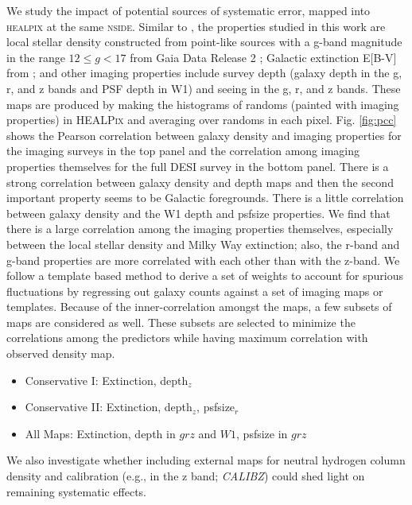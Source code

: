 We study the impact of potential sources of systematic error, mapped into \textsc{healpix} at the same \textsc{nside}. Similar to \cite{zhou2022target}, the properties studied in this work are local stellar density constructed from point-like sources with a g-band magnitude in the range $12 \leq g < 17$ from Gaia Data Release 2 \citep[see,][]{gaiadr2, myers2022};  Galactic extinction E[B-V] from \cite{schlegel1998maps}; and other imaging properties include survey depth (galaxy depth in the g, r, and z bands and PSF depth in W1) and seeing in the g, r, and z bands. These maps are produced by making the histograms of randoms (painted with imaging properties) in \textsc{HEALPix} and averaging over randoms in each pixel. Fig. \ref{fig:pcc} shows the Pearson correlation between galaxy density and imaging properties for the imaging surveys in the top panel and the correlation among imaging properties themselves for the full DESI survey in the bottom panel. There is a strong correlation between galaxy density and depth maps and then the second important property seems to be Galactic foregrounds. There is a little correlation between galaxy density and the W1 depth and psfsize properties. We find that there is a large correlation among the imaging properties themselves, especially between the local stellar density and Milky Way extinction; also, the r-band and g-band properties are more correlated with each other than with the z-band. We follow a template based method to derive a set of weights to account for spurious fluctuations by regressing out galaxy counts against a set of imaging maps or templates.  Because of the inner-correlation amongst the maps, a few subsets of maps are considered as well. These subsets are selected to minimize the correlations among the predictors while having maximum correlation with observed density map.
\begin{itemize}
\item Conservative I: Extinction, depth$_{z}$
\item Conservative II: Extinction, depth$_{z}$, psfsize$_{r}$
\item All Maps: Extinction, depth in $grz$ and $W1$, psfsize in $grz$
\end{itemize}
We also investigate whether including external maps for neutral hydrogen column density  and calibration (e.g., in the z band; \textit{CALIBZ}) could shed light on remaining systematic effects. 

